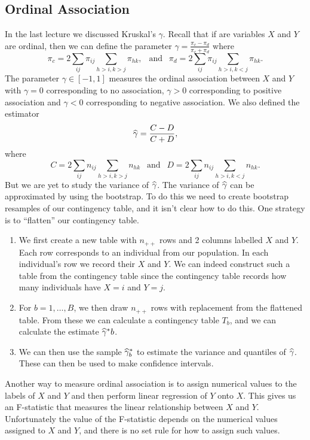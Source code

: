 \subsection{Ordinal Association}
In the last lecture we discussed Kruskal's $\gamma$. Recall that if are variables $X$ and $Y$ are ordinal, then we can define the parameter $\gamma = \frac{\pi_c-\pi_d}{\pi_c+\pi_d}$ where
\[\pi_c =2\sum_{ij}\pi_{ij} \sum_{h>i,k>j}\pi_{hk}, ~~\text{ and }~~\pi_d =2\sum_{ij}\pi_{ij} \sum_{h>i,k<j}\pi_{hk}. \]
The parameter $\gamma \in [-1,1]$ measures the ordinal association between $X$ and $Y$ with $\gamma = 0$ corresponding to no association, $\gamma > 0$ corresponding to positive association and $\gamma < 0$ corresponding to negative association. We also defined the estimator
\[\widehat{\gamma} = \frac{C-D}{C+D}, \]
where
\[C = 2\sum_{ij}n_{ij} \sum_{h>i,k>j}n_{hk} ~~\text{ and }~~ D = 2\sum_{ij}n_{ij} \sum_{h > i, k<j} n_{hk}.  \]
But we are yet to study the variance of $\widehat{\gamma}$. The variance of $\widehat{\gamma}$ can be approximated by using the bootstrap. To do this we need to create bootstrap resamples of our contingency table, and it isn't clear how to do this. One strategy is to ``flatten'' our contingency table.
\begin{enumerate}
    \item We first create a new table with $n_{++}$ rows and 2 columns labelled $X$ and $Y$. Each row corresponds to an individual from our population. In each individual's row we record their $X$ and $Y$. We can indeed construct such a table from the contingency table since the contingency table records how many individuals have $X=i$ and $Y=j$.
    \item For $b=1,\ldots,B$, we then draw $n_{++}$ rows with replacement from the flattened table. From these we can calculate a contingency table $T_b$, and we can calculate the estimate $\widehat{\gamma}^*b$.
    \item We can then use the sample $\widehat{\gamma}^*_b$ to estimate the variance and quantiles of $\widehat{\gamma}$. These can then be used to make confidence intervals. 
\end{enumerate}
Another way to measure ordinal association is to assign numerical values to the labels of $X$ and $Y$ and then perform linear regression of $Y$ onto $X$. This gives us an F-statistic that measures the linear relationship between $X$ and $Y$. Unfortunately the value of the F-statistic depends on the numerical values assigned to $X$ and $Y$, and there is no set rule for how to assign such values.
